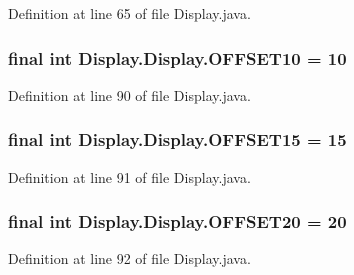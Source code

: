 Definition at line 65 of file Display.\+java.

\hypertarget{class_display_1_1_display_a43bf93ef0872de87948d181590683656}{}
\subsubsection[{O\+F\+F\+S\+E\+T10}]{\setlength{\rightskip}{0pt plus 5cm}final int Display.\+Display.\+O\+F\+F\+S\+E\+T10 = 10\hspace{0.3cm}{\ttfamily [static]}}\label{class_display_1_1_display_a43bf93ef0872de87948d181590683656}


Definition at line 90 of file Display.\+java.

\hypertarget{class_display_1_1_display_a3fb4f586318e61f3ad9d15d058ce15b8}{}
\subsubsection[{O\+F\+F\+S\+E\+T15}]{\setlength{\rightskip}{0pt plus 5cm}final int Display.\+Display.\+O\+F\+F\+S\+E\+T15 = 15\hspace{0.3cm}{\ttfamily [static]}}\label{class_display_1_1_display_a3fb4f586318e61f3ad9d15d058ce15b8}


Definition at line 91 of file Display.\+java.

\hypertarget{class_display_1_1_display_a2969279ab92fa68405072414fa62c987}{}
\subsubsection[{O\+F\+F\+S\+E\+T20}]{\setlength{\rightskip}{0pt plus 5cm}final int Display.\+Display.\+O\+F\+F\+S\+E\+T20 = 20\hspace{0.3cm}{\ttfamily [static]}}\label{class_display_1_1_display_a2969279ab92fa68405072414fa62c987}


Definition at line 92 of file Display.\+java.

\hypertarget{class_display_1_1_display_af6173975e03ce9913d8935d6f8040e5b}{}
